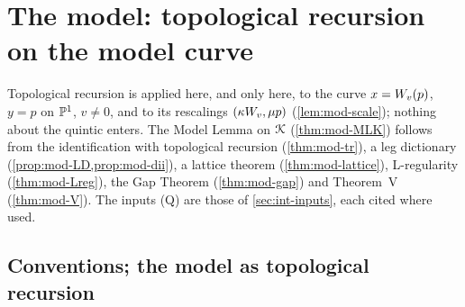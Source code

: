 \section{The model: topological recursion on the model curve}
\label{sec:mod}

Topological recursion is applied here, and only here, to the curve $x=W_{v}(p)$, $y=p$ on $\mathbb{P}^1$, $v\neq 0$, and to its rescalings $(\kappa W_{v},\mu p)$ (\cref{lem:mod-scale}); nothing about the quintic enters. The Model Lemma on $\mathcal{K}$ (\cref{thm:mod-MLK}) follows from the identification with topological recursion (\cref{thm:mod-tr}), a leg dictionary (\cref{prop:mod-LD,prop:mod-dii}), a lattice theorem (\cref{thm:mod-lattice}), L-regularity (\cref{thm:mod-Lreg}), the Gap Theorem (\cref{thm:mod-gap}) and Theorem~V (\cref{thm:mod-V}). The inputs (Q) are those of \cref{sec:int-inputs}, each cited where used.

\subsection{Conventions; the model as topological recursion}
\label{sec:mod-tr}

